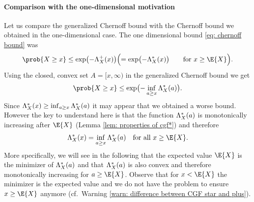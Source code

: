 \paragraph*{Comparison with the one-dimensional motivation}
Let us compare the generalized Chernoff bound with the Chernoff bound
we obtained in the one-dimensional case. The one dimensional bound \eqref{eq: chernoff bound}
was
\[
    \prob{X \ge x} \le \exp\bigl(-\CGF_X^+(x)\bigr)
    \Bigl(= \exp\bigl(-\CGF_X^*(x)\bigr) \qquad \text{for } x \ge \E{X}\Bigr).
\]
Using the closed, convex set \(A=[x, \infty)\) in the generalized Chernoff bound we get
\[
    \prob{X \ge x} \le \exp\bigl(-\inf_{a\ge x} \CGF_X^*(a)\bigr).
\]
Since \(\Lambda_X^*(x) \ge \inf_{a\ge x} \Lambda_X^*(a)\) it may appear
that we obtained a worse bound. However the key to understand here is that the
function \(\Lambda_X^*(a)\) is monotonically increasing after \(\E{X}\) (Lemma \ref{lem: properties of cgf*}) 
and therefore
\[
    \CGF_X^*(x) = \inf_{a\ge x} \CGF_X^*(a) \quad \text{for all } x \ge \E{X}.
\]
More specifically, we will see in the following that the expected value \(\E{X}\)
is the minimizer of \(\Lambda_X^*(a)\) and that \(\Lambda_X^*(a)\) is also convex and therefore
monotonically increasing for \(a \ge \E{X}\). Observe that for \(x< \E{X}\)
the minimizer is the expected value and we do not have the problem to ensure \(x
\ge \E{X}\) anymore (cf.~Warning \ref{warn: difference between CGF star and
plus}).

